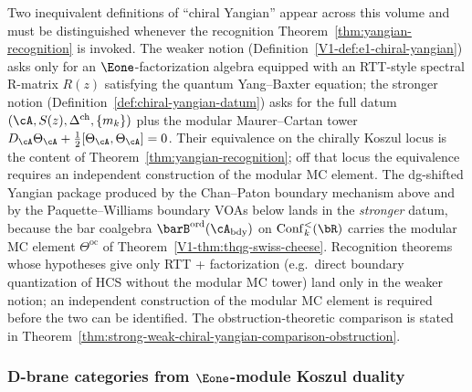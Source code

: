 \begin{remark}
\label{rem:ht-yangian-two-definitions}
Two inequivalent definitions of ``chiral Yangian'' appear across
this volume and must be distinguished whenever the recognition
Theorem~\ref{thm:yangian-recognition} is invoked. The weaker
notion (Definition~\ref{V1-def:e1-chiral-yangian}) asks only for an
$\Eone$-factorization algebra equipped with an RTT-style spectral
R-matrix $R(z)$ satisfying the quantum Yang--Baxter equation; the
stronger notion (Definition~\ref{def:chiral-yangian-datum}) asks
for the full datum $(\cA, S(z), \Delta^{\mathrm{ch}}, \{m_k\})$
plus the modular Maurer--Cartan tower
$D_\cA \Theta_\cA + \tfrac{1}{2}[\Theta_\cA,\Theta_\cA]=0$.
Their equivalence on the chirally Koszul locus is the content
of Theorem~\ref{thm:yangian-recognition}; off that locus the
equivalence requires an independent construction of the modular MC
element.
The dg-shifted Yangian package produced by the Chan--Paton
boundary mechanism above and by the Paquette--Williams boundary
VOAs below lands in the \emph{stronger} datum, because the bar
coalgebra $\barB^{\mathrm{ord}}(\cA_{\mathrm{bdy}})$ on
$\Conf_k^<(\bR)$ carries the modular MC element $\Theta^{\mathrm{oc}}$
of Theorem~\ref*{V1-thm:thqg-swiss-cheese}. Recognition theorems
whose hypotheses give only RTT + factorization (e.g.\ direct
boundary quantization of HCS without the modular MC tower) land
only in the weaker notion; an independent construction of the
modular MC element is required before the two can be identified.
The obstruction-theoretic comparison is stated in
Theorem~\ref{thm:strong-weak-chiral-yangian-comparison-obstruction}.
\end{remark}

\subsubsection{\texorpdfstring{D-brane categories from $\Eone$-module Koszul duality}{D-brane categories from E1-module Koszul duality}}

